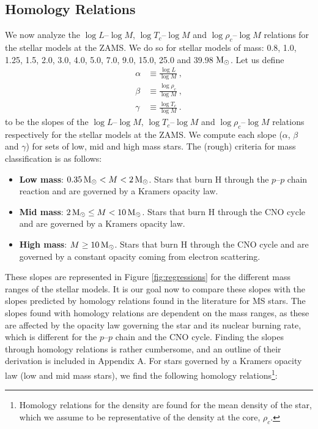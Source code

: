 

\subsection{Homology Relations}

We now analyze the $\log L \text{--} \log M$, $\log T_c \text{--} \log M$ and $\log \rho_c \text{--} \log M$ relations for the stellar models at the ZAMS. We do so for stellar models of mass: 0.8, 1.0, 1.25, 1.5, 2.0, 3.0, 4.0, 5.0, 7.0, 9.0, 15.0, 25.0 and 39.98 ${\rm M}_\odot$. Let us define
\begin{align}
    \alpha & \equiv \frac{\log L}{\log M} \ , \label{eq:alpha}      \\
    \beta  & \equiv \frac{\log \rho_c}{\log M} \ ,  \label{eq:beta} \\
    \gamma & \equiv \frac{\log T_c}{\log M} \ . \label{eq:gamma}
\end{align}
to be the slopes of the $\log L \text{--} \log M$, $\log T_c \text{--} \log M$ and $\log \rho_c \text{--} \log M$ relations respectively for the stellar models at the ZAMS. We compute each slope ($\alpha$, $\beta$ and $\gamma$) for sets of low, mid and high mass stars. The (rough) criteria for mass classification is as follows:
\begin{itemize}
    \item \textbf{Low mass}: $0.35 \, {\rm M}_\odot < M < 2 \, {\rm M}_\odot$. Stars that burn H through the $p\text{--}p$ chain reaction and are governed by a Kramers opacity law.
    \item \textbf{Mid mass}: $ 2 \, {\rm M}_\odot \leq M < 10 \, {\rm M}_\odot$. Stars that burn H through the CNO cycle and are governed by a Kramers opacity law.
    \item \textbf{High mass}: $M \geq 10 \, {\rm M}_\odot$. Stars that burn H through the CNO cycle and are governed by a constant opacity coming from electron scattering.
\end{itemize}
These slopes are represented in Figure \ref{fig:regressions} for the different mass ranges of the stellar models. It is our goal now to compare these slopes with the slopes predicted by homology relations found in the literature for MS stars. The slopes found with homology relations are dependent on the mass ranges, as these are affected by the opacity law governing the star and its nuclear burning rate, which is different for the $p\text{--}p$ chain and the CNO cycle. Finding the slopes through homology relations is rather cumbersome, and an outline of their derivation is included in Appendix A. For stars governed by a Kramers opacity law  (low and mid mass stars), we find the following homology relations\footnote{Homology relations for the density are found for the mean density of the star, which we assume to be representative of the density at the core, $\rho_c$.}:
